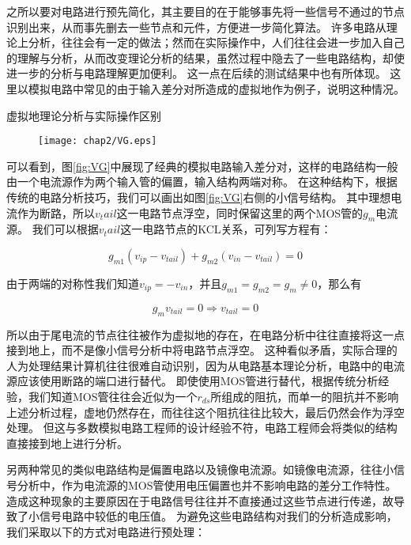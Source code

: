 之所以要对电路进行预先简化，其主要目的在于能够事先将一些信号不通过的节点识别出来，从而事先删去一些节点和元件，方便进一步简化算法。
许多电路从理论上分析，往往会有一定的做法；然而在实际操作中，人们往往会进一步加入自己的理解与分析，从而改变理论分析的结果，虽然过程中隐去了一些电路结构，却使进一步的分析与电路理解更加便利。
这一点在后续的测试结果中也有所体现。
这里以模拟电路中常见的由于输入差分对所造成的虚拟地作为例子，说明这种情况。

\begin{exmp}
虚拟地理论分析与实际操作区别

\begin{figure}[!htp]
	\centering
	\texttt{[image: chap2/VG.eps]}
\end{figure}

可以看到，图\ref{fig:VG}中展现了经典的模拟电路输入差分对，这样的电路结构一般由一个电流源作为两个输入管的偏置，输入结构两端对称。
在这种结构下，根据传统的电路分析技巧，我们可以画出如图\ref{fig:VG}右侧的小信号结构。
其中理想电流作为断路，所以$v_tail$这一电路节点浮空，同时保留这里的两个MOS管的$g_m$电流源。
我们可以根据$v_tail$这一电路节点的KCL关系，可列写方程有：

\begin{equation}
g_{m1}\left(v_{ip}-v_{tail}\right)+g_{m2}\left(v_{in}-v_{tail}\right)=0
\end{equation}

由于两端的对称性我们知道$v_{ip}=-v_{in}$，并且$g_{m1}=g_{m2}=g_m\neq0$，那么有

\begin{equation}
g_{m} v_{tail} = 0 \Rightarrow v_{tail} = 0
\end{equation}

所以由于尾电流的节点往往被作为虚拟地的存在，在电路分析中往往直接将这一点接到地上，而不是像小信号分析中将电路节点浮空。
这种看似矛盾，实际合理的人为处理结果计算机往往很难自动识别，因为从电路基本理论分析，电路中的电流源应该使用断路的端口进行替代。
即使使用MOS管进行替代，根据传统分析经验，我们知道MOS管往往会近似为一个$r_{ds}$所组成的阻抗，而单一的阻抗并不影响上述分析过程，虚地仍然存在，而往往这个阻抗往往比较大，最后仍然会作为浮空处理。
但这与多数模拟电路工程师的设计经验不符，电路工程师会将类似的结构直接接到地上进行分析。

\end{exmp}

另两种常见的类似电路结构是偏置电路以及镜像电流源。如镜像电流源，往往小信号分析中，作为电流源的MOS管使用电压偏置也并不影响电路的差分工作特性。
造成这种现象的主要原因在于电路信号往往并不直接通过这些节点进行传递，故导致了小信号电路中较低的电压值。
为避免这些电路结构对我们的分析造成影响，我们采取以下的方式对电路进行预处理：

